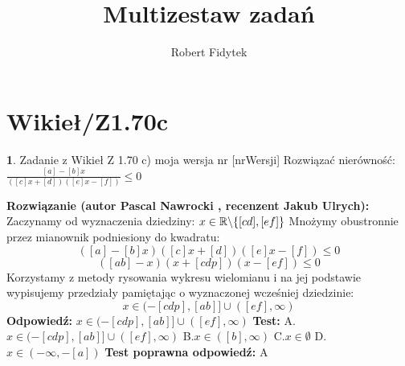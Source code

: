 \documentclass[12pt, a4paper]{article}
\title{Multizestaw zadań}
\author{Robert Fidytek}
\date{}
\theoremstyle{definition} %
\newtheorem{zad}{}
\newcommand{\kategoria}[1]{\section{#1}} %
\newcommand{\zadStart}[1]{\begin{zad}#1\newline} %
\newcommand{\zadStop}{\end{zad}}   %
\newcommand{\rozwStart}[2]{\noindent \textbf{Rozwiązanie (autor #1 , recenzent #2): }\newline} %
\newcommand{\odpStart}{\noindent \textbf{Odpowiedź:}\newline}    %
\newcommand{\odpStop}{\newline}                                             %
\newcommand{\testStart}{\noindent \textbf{Test:}\newline} %
\newcommand{\testStop}{\newline} %
\newcommand{\kluczStart}{\noindent \textbf{Test poprawna odpowiedź:}\newline} %
\newcommand{\kluczStop}{\newline} %
\begin{document}
\maketitle


\kategoria{Wikieł/Z1.70c}
\zadStart{Zadanie z Wikieł Z 1.70 c) moja wersja nr [nrWersji]}
Rozwiązać nierówność: $\frac{[a]-[b]x}{([c]x+[d])([e]x-[f])}\leq0$
\zadStop
\rozwStart{Pascal Nawrocki}{Jakub Ulrych}
Zaczynamy od wyznaczenia dziedziny: $x\in\mathbb{R}\symbol{92}\{[cd],[ef]\}$
Mnożymy obustronnie przez mianownik podniesiony do kwadratu:
$$([a]-[b]x)([c]x+[d])([e]x-[f])\leq0$$
$$([ab]-x)(x+[cdp])(x-[ef])\leq0$$
Korzystamy z metody rysowania wykresu wielomianu i na jej podstawie wypisujemy przedziały pamiętając o wyznaczonej wcześniej dziedzinie:
$$x\in(-[cdp],[ab]]\cup([ef],\infty)$$
\odpStart
$x\in(-[cdp],[ab]]\cup([ef],\infty)$
\odpStop
\testStart
A.$x\in(-[cdp],[ab]]\cup([ef],\infty)$
B.$x\in([b],\infty)$
C.$x\in\emptyset$
D.$x\in(-\infty,-[a])$
\testStop
\kluczStart
A
\kluczStop
\end{document}
